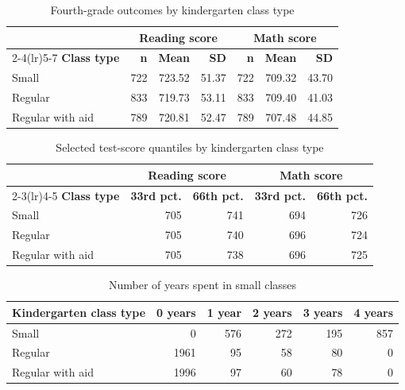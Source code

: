 \documentclass[12pt]{article}
\begin{document}
\begin{table}[H]
\centering
\caption{Fourth-grade outcomes by kindergarten class type}\label{tab:star-means}
\begin{tabular}{lrrrrrr}
\toprule
& \multicolumn{3}{c}{Reading score} & \multicolumn{3}{c}{Math score} \\
\cmidrule(lr){2-4}\cmidrule(lr){5-7}
\textbf{Class type} & \textbf{n} & \textbf{Mean} & \textbf{SD} & \textbf{n} & \textbf{Mean} & \textbf{SD} \\
\midrule
Small & 722 & 723.52 & 51.37 & 722 & 709.32 & 43.70 \\
Regular & 833 & 719.73 & 53.11 & 833 & 709.40 & 41.03 \\
Regular with aid & 789 & 720.81 & 52.47 & 789 & 707.48 & 44.85 \\
\bottomrule
\end{tabular}
\end{table}

\begin{table}[H]
\centering
\caption{Selected test-score quantiles by kindergarten class type}\label{tab:star-quantiles}
\begin{tabular}{lrrrr}
\toprule
& \multicolumn{2}{c}{Reading score} & \multicolumn{2}{c}{Math score} \\
\cmidrule(lr){2-3}\cmidrule(lr){4-5}
\textbf{Class type} & \textbf{33rd pct.} & \textbf{66th pct.} & \textbf{33rd pct.} & \textbf{66th pct.} \\
\midrule
Small & 705 & 741 & 694 & 726 \\
Regular & 705 & 740 & 696 & 724 \\
Regular with aid & 705 & 738 & 696 & 725 \\
\bottomrule
\end{tabular}
\end{table}

\begin{table}[H]
\centering
\caption{Number of years spent in small classes}\label{tab:star-years-counts}
\begin{tabular}{lrrrrr}
\toprule
\textbf{Kindergarten class type} & \textbf{0 years} & \textbf{1 year} & \textbf{2 years} & \textbf{3 years} & \textbf{4 years} \\
\midrule
Small & 0 & 576 & 272 & 195 & 857 \\
Regular & 1961 & 95 & 58 & 80 & 0 \\
Regular with aid & 1996 & 97 & 60 & 78 & 0 \\
\bottomrule
\end{tabular}
\end{table}
\end{document}
